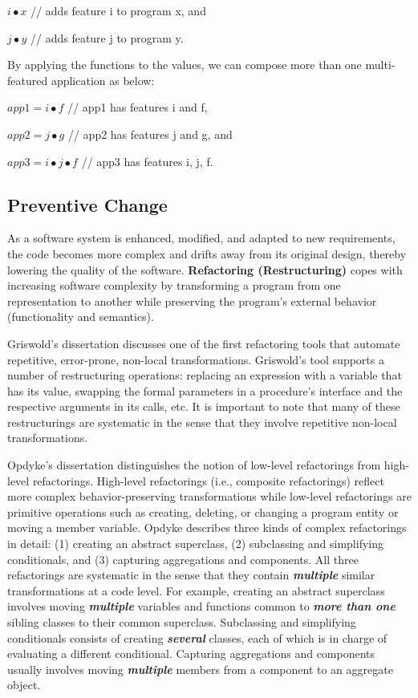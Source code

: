 \documentclass[runningheads,a4paper]{llncs}
\begin{document}
$i \bullet x$ // adds feature i to program x, and 

$j \bullet y$ // adds feature j to program y.

By applying the functions to the values, we can compose more than one multi-featured application as below:

$app1 = i \bullet f$ // app1 has features i and f,

$app2 = j \bullet g$ // app2 has features j and g, and
 
$app3 = i \bullet j \bullet f$ // app3 has features i, j, f.

 
 

\subsection{Preventive Change}
\label{sec:preventive}

As a software system is enhanced, modified, and adapted to new requirements, the code becomes more complex and drifts away from its original design, thereby lowering the quality of the software. {\bf Refactoring (Restructuring)} \cite{Fowler2000, Griswold1991, Opdyke1992, Mens2004} copes with increasing software complexity by transforming a program from one representation to another while preserving the program's external behavior (functionality and semantics).%

Griswold's dissertation \cite{Griswold1991} discusses one of the first refactoring tools that automate repetitive, error-prone, non-local transformations. Griswold's tool supports a number of restructuring operations: replacing an expression with a variable that has its value, swapping the formal parameters in a procedure's interface and the respective arguments in its calls, etc. It is important to note that many of these restructurings are systematic in the sense that they involve repetitive non-local transformations. 

Opdyke's dissertation \cite{Opdyke1992} distinguishes the notion of low-level refactorings from high-level refactorings. High-level refactorings (i.e., composite refactorings) reflect more complex behavior-preserving transformations while low-level refactorings are primitive operations such as creating, deleting, or changing a program entity or moving a member variable. Opdyke describes three kinds of complex refactorings in detail: (1) creating an abstract superclass, (2) subclassing and simplifying conditionals, and (3) capturing aggregations and components. All three refactorings are systematic in the sense that they contain {\bf \em multiple} similar transformations at a code level. For example, {creating an abstract superclass} involves moving {\bf \em multiple} variables and functions common to {\bf \em more than one} sibling classes to their common superclass.  {Subclassing and simplifying conditionals} consists of creating {\bf \em several} classes, each of which is in charge of evaluating a different conditional.  {Capturing aggregations and components} usually involves moving {\bf \em multiple} members from a component to an aggregate object. 
\end{document}
